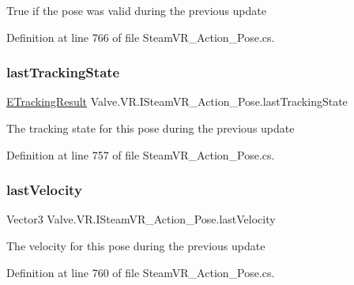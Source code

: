 True if the pose was valid during the previous update 



Definition at line 766 of file Steam\+V\+R\+\_\+\+Action\+\_\+\+Pose.\+cs.

\mbox{\label{interface_valve_1_1_v_r_1_1_i_steam_v_r___action___pose_a83d1cfa62995bc1b06fefb47923baff6}} 
\subsubsection{\texorpdfstring{lastTrackingState}{lastTrackingState}}
{\footnotesize\ttfamily \mbox{\hyperlink{namespace_valve_1_1_v_r_abe6feab98f33191b7c27b4292012e90a}{E\+Tracking\+Result}} Valve.\+V\+R.\+I\+Steam\+V\+R\+\_\+\+Action\+\_\+\+Pose.\+last\+Tracking\+State\hspace{0.3cm}{\ttfamily [get]}}



The tracking state for this pose during the previous update 



Definition at line 757 of file Steam\+V\+R\+\_\+\+Action\+\_\+\+Pose.\+cs.

\mbox{\label{interface_valve_1_1_v_r_1_1_i_steam_v_r___action___pose_a4d80572375879d684549fc318028131c}} 
\subsubsection{\texorpdfstring{lastVelocity}{lastVelocity}}
{\footnotesize\ttfamily Vector3 Valve.\+V\+R.\+I\+Steam\+V\+R\+\_\+\+Action\+\_\+\+Pose.\+last\+Velocity\hspace{0.3cm}{\ttfamily [get]}}



The velocity for this pose during the previous update 



Definition at line 760 of file Steam\+V\+R\+\_\+\+Action\+\_\+\+Pose.\+cs.

